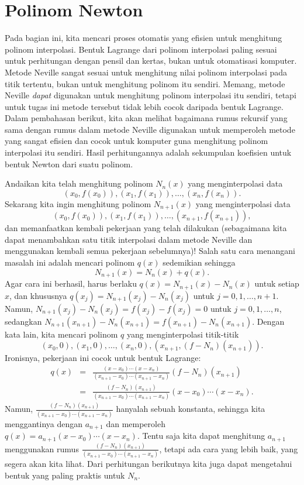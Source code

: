 
\section{\label{sec:polynomialNewton}Polinom Newton}

Pada bagian ini, kita mencari proses otomatis yang efisien untuk menghitung
polinom interpolasi. Bentuk Lagrange dari polinom interpolasi paling
sesuai untuk perhitungan dengan pensil dan kertas, bukan untuk otomatisasi
komputer. Metode Neville sangat sesuai untuk menghitung nilai polinom
interpolasi pada titik tertentu, bukan untuk menghitung polinom itu
sendiri. Memang, metode Neville \textit{dapat} digunakan untuk menghitung
polinom interpolasi itu sendiri, tetapi untuk tugas ini metode tersebut
tidak lebih cocok daripada bentuk Lagrange. Dalam pembahasan berikut,
kita akan melihat bagaimana rumus rekursif yang sama dengan rumus
dalam metode Neville digunakan untuk memperoleh metode yang sangat
efisien dan cocok untuk komputer guna menghitung polinom interpolasi
itu sendiri. Hasil perhitungannya adalah sekumpulan koefisien untuk
bentuk Newton dari suatu polinom.

Andaikan kita telah menghitung polinom $N_{n}(x)$ yang menginterpolasi
data 
\[
(x_{0},f(x_{0})),(x_{1},f(x_{1})),\ldots,(x_{n},f(x_{n})).
\]
Sekarang kita ingin menghitung polinom $N_{n+1}(x)$ yang menginterpolasi
data 
\[
(x_{0},f(x_{0})),(x_{1},f(x_{1})),\ldots,(x_{n+1},f(x_{n+1})),
\]
dan memanfaatkan kembali pekerjaan yang telah dilakukan (sebagaimana
kita dapat menambahkan satu titik interpolasi dalam metode Neville
dan menggunakan kembali semua pekerjaan sebelumnya)! Salah satu cara
menangani masalah ini adalah mencari polinom $q(x)$ sedemikian sehingga
\[
N_{n+1}(x)=N_{n}(x)+q(x).
\]
Agar cara ini berhasil, harus berlaku $q(x)=N_{n+1}(x)-N_{n}(x)$
untuk setiap $x$, dan khususnya $q(x_{j})=N_{n+1}(x_{j})-N_{n}(x_{j})$
untuk $j=0,1,\ldots,n+1$. Namun, $N_{n+1}(x_{j})-N_{n}(x_{j})=f(x_{j})-f(x_{j})=0$
untuk $j=0,1,\ldots,n$, sedangkan $N_{n+1}(x_{n+1})-N_{n}(x_{n+1})=f(x_{n+1})-N_{n}(x_{n+1})$.
Dengan kata lain, kita mencari polinom $q$ yang menginterpolasi titik-titik
\[
(x_{0},0),(x_{1},0),\ldots,(x_{n},0),(x_{n+1},(f-N_{n})(x_{n+1})).
\]
Ironisnya, pekerjaan ini cocok untuk bentuk Lagrange:
\begin{eqnarray}
q(x) & = & \frac{(x-x_{0})\cdots(x-x_{n})}{(x_{n+1}-x_{0})\cdots(x_{n+1}-x_{n})}(f-N_{n})(x_{n+1})\nonumber \\
 & = & \frac{(f-N_{n})(x_{n+1})}{(x_{n+1}-x_{0})\cdots(x_{n+1}-x_{n})}(x-x_{0})\cdots(x-x_{n}).\label{eq:qLagrange}
\end{eqnarray}
Namun, $\frac{(f-N_{n})(x_{n+1})}{(x_{n+1}-x_{0})\cdots(x_{n+1}-x_{n})}$
hanyalah sebuah konstanta, sehingga kita menggantinya dengan $a_{n+1}$
dan memperoleh $q(x)=a_{n+1}(x-x_{0})\cdots(x-x_{n})$. Tentu saja
kita dapat menghitung $a_{n+1}$ menggunakan rumus $\frac{(f-N_{n})(x_{n+1})}{(x_{n+1}-x_{0})\cdots(x_{n+1}-x_{n})}$,
tetapi ada cara yang lebih baik, yang segera akan kita lihat. Dari
perhitungan berikutnya kita juga dapat mengetahui bentuk yang paling
praktis untuk $N_{n}$.

